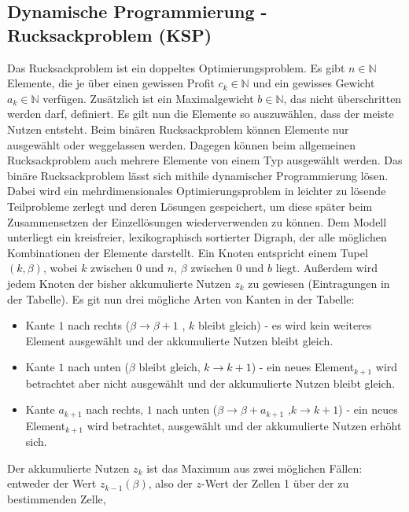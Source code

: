 \documentclass[10pt,a4paper,landscape]{article}
\begin{document}
\begin{multicols*}{2}
    \subsection{ Dynamische Programmierung - Rucksackproblem (KSP) }
    Das Rucksackproblem ist ein doppeltes Optimierungsproblem. Es gibt $n \in \mathbb{N}$ Elemente, 
    die je über einen gewissen Profit $c_k \in \mathbb{N}$ und ein gewisses Gewicht $a_k \in \mathbb{N}$ verfügen. 
    Zusätzlich ist ein Maximalgewicht $b \in \mathbb{N}$, das nicht überschritten werden darf, definiert. 
    Es gilt nun die Elemente so auszuwählen, dass der meiste Nutzen entsteht.
    \newline
    Beim binären Rucksackproblem können Elemente nur ausgewählt oder weggelassen werden. Dagegen können beim allgemeinen Rucksackproblem 
    auch mehrere Elemente von einem Typ ausgewählt werden.
    \newline
    Das binäre Rucksackproblem lässt sich mithile dynamischer Programmierung lösen. Dabei wird ein mehrdimensionales Optimierungsproblem
    in leichter zu lösende Teilprobleme zerlegt und deren Lösungen gespeichert, um diese später beim Zusammensetzen der Einzellösungen 
    wiederverwenden zu können. Dem Modell unterliegt ein kreisfreier, lexikographisch sortierter Digraph, der alle möglichen Kombinationen der Elemente 
    darstellt. Ein Knoten entspricht einem Tupel $(k,\beta)$, wobei $k$ zwischen $0$ und $n$, $\beta$ zwischen $0$ und $b$ liegt. 
    Außerdem wird jedem Knoten der bisher akkumulierte Nutzen $z_k$ zu gewiesen (Eintragungen in der Tabelle).
    \newline
    Es git nun drei mögliche Arten von Kanten in der Tabelle:
    \begin{itemize}
        \item Kante $1$ nach rechts ($\beta \rightarrow \beta + 1$ , $k$ bleibt gleich) - es wird kein weiteres Element ausgewählt und der akkumulierte Nutzen bleibt gleich.
        \item Kante $1$ nach unten  ($\beta$ bleibt gleich, $k \rightarrow k + 1$) - ein neues Element$_{k+1}$ wird betrachtet aber nicht ausgewählt und der akkumulierte Nutzen bleibt gleich. 
        \item Kante $a_{k+1}$ nach rechts, $1$ nach unten ($\beta \rightarrow \beta + a_{k+1}$ ,$k \rightarrow k + 1$) - ein neues Element$_{k+1}$ wird betrachtet, ausgewählt und der akkumulierte Nutzen erhöht sich.
    \end{itemize}
    Der akkumulierte Nutzen $z_k$ ist das Maximum aus zwei möglichen Fällen: entweder der Wert $z_{k-1}(\beta)$, also der $z$-Wert der Zellen 1 über der zu bestimmenden Zelle,

\end{multicols*}
\end{document}
